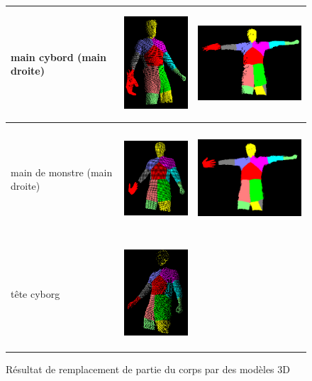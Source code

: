 \begin{figure}[!ht]
\begin{center}
\begin{tabular}{C{2cm}|c|c}
      main cybord (main droite) & \includegraphics[height=4cm]{image/cyborgHand1.PNG} & \includegraphics[height=4cm]{image/cyborgHand2.PNG} \\
      \hline
      main de monstre (main droite) & \includegraphics[height=4cm]{image/monsterHand1.PNG} & \includegraphics[height=4cm]{image/monsterHand2.PNG} \\
      \hline
      tête cyborg & \includegraphics[height=4cm]{image/cyborgHead.PNG} &  \\
      \hline
    \end{tabular}
    \caption{Résultat de remplacement de partie du corps par des modèles 3D}
    \label{tab:modelMatching}
  \end{center}
\end{figure}
\newpage

